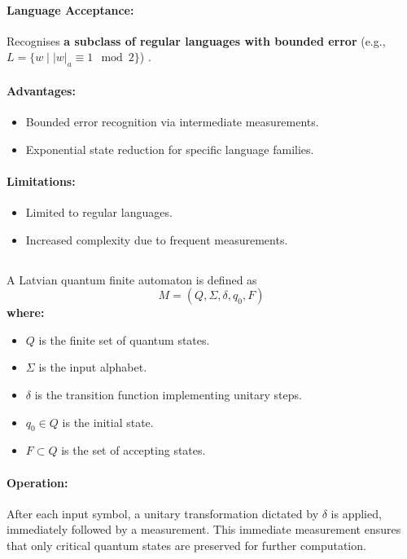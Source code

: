 \paragraph{Language Acceptance:}  
Recognises \textbf{a subclass of regular languages with bounded error} (e.g., \( L = \{w \mid |w|_a \equiv 1 \mod 2\} \)) \cite{ambainis1998}.

\paragraph{Advantages:}
\begin{itemize}
    \item Bounded error recognition via intermediate measurements.
    \item Exponential state reduction for specific language families.
\end{itemize}

\paragraph{Limitations:}
\begin{itemize}
    \item Limited to regular languages.
    \item Increased complexity due to frequent measurements.
\end{itemize}

\subsection{}
\label{subsec:lqfa}
\begin{definition}
A Latvian quantum finite automaton is defined as 
\[
M = (Q, \Sigma, \delta, q_0, F)
\]
\textbf{where:}
\begin{itemize}
    \item \( Q \) is the finite set of quantum states.
    \item \( \Sigma \) is the input alphabet.
    \item \( \delta \) is the transition function implementing unitary steps.
    \item \( q_0 \in Q \) is the initial state.
    \item \( F \subset Q \) is the set of accepting states.
\end{itemize}
\end{definition}

\paragraph{Operation:}  
After each input symbol, a unitary transformation dictated by \( \delta \) is applied, immediately followed by a measurement. This immediate measurement ensures that only critical quantum states are preserved for further computation.

